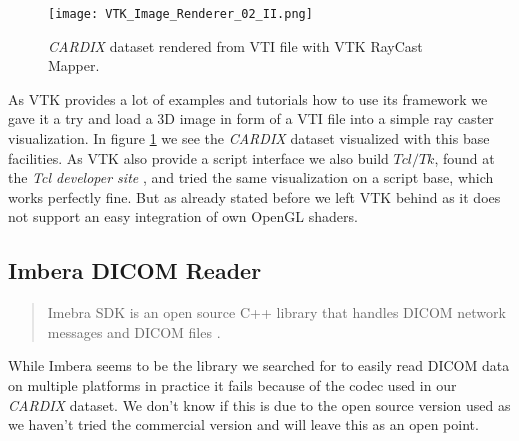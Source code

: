 \begin{figure}[h]
	\centering
	\texttt{[image: VTK\_Image\_Renderer\_02\_II.png]} \\
	\caption{ \emph{CARDIX} \cite{gimias_sampledata_2018} dataset rendered from VTI file with VTK RayCast Mapper.}
	\label{fig:VTK_Image_Renderer_02_II}
\end{figure}

As VTK provides a lot of examples and tutorials how to use its framework we gave it a try and load a 3D image in form of a VTI file into a simple ray caster visualization. In figure \ref{fig:VTK_Image_Renderer_02_II} we see the \emph{CARDIX} \cite{gimias_sampledata_2018} dataset visualized with this base facilities. As VTK also provide a script interface we also build $Tcl/Tk$, found at the \emph{Tcl developer site} \cite{tcl_developer_site_2018}, and tried the same visualization on a script base, which works perfectly fine. But as already stated before we left VTK behind as it does not support an easy integration of own OpenGL shaders.





\subsection{Imbera DICOM Reader}


\blockquote{Imebra SDK is an open source C++ library that handles DICOM network messages and DICOM files \cite{imebra_dicom_sdk_2018}.}

While Imbera seems to be the library we searched for to easily read DICOM data on multiple platforms in practice it fails because of the codec used in our \emph{CARDIX} dataset. We don't know if this is due to the open source version used as we haven't tried the commercial version  and will leave this as an open point.

